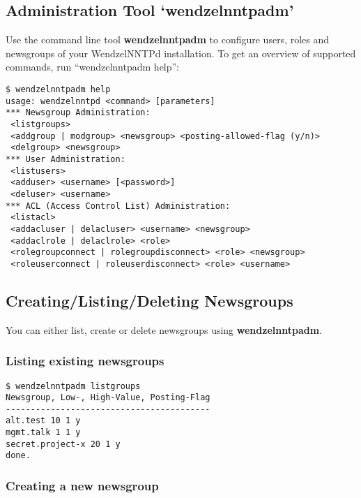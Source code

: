 \documentclass[12pt,fleqn,leqno]{scrbook}
\begin{document}
\hypertarget{administration-tool-wendzelnntpadm}{%
\subsection{Administration Tool
`wendzelnntpadm'}\label{administration-tool-wendzelnntpadm}}

Use the command line tool \textbf{wendzelnntpadm} to configure users,
roles and newsgroups of your WendzelNNTPd installation. To get an
overview of supported commands, run ``wendzelnntpadm help'':

\begin{verbatim}
$ wendzelnntpadm help
usage: wendzelnntpd <command> [parameters]
*** Newsgroup Administration:
 <listgroups>
 <addgroup | modgroup> <newsgroup> <posting-allowed-flag (y/n)>
 <delgroup> <newsgroup>
*** User Administration:
 <listusers>
 <adduser> <username> [<password>]
 <deluser> <username>
*** ACL (Access Control List) Administration:
 <listacl>
 <addacluser | delacluser> <username> <newsgroup>
 <addaclrole | delaclrole> <role>
 <rolegroupconnect | rolegroupdisconnect> <role> <newsgroup>
 <roleuserconnect | roleuserdisconnect> <role> <username>
\end{verbatim}

\hypertarget{creatinglistingdeleting-newsgroups}{%
\subsection{Creating/Listing/Deleting
Newsgroups}\label{creatinglistingdeleting-newsgroups}}

You can either list, create or delete newsgroups using
\textbf{wendzelnntpadm}.

\hypertarget{listing-existing-newsgroups}{%
\subsubsection{Listing existing
newsgroups}\label{listing-existing-newsgroups}}

\begin{verbatim}
$ wendzelnntpadm listgroups
Newsgroup, Low-, High-Value, Posting-Flag
-----------------------------------------
alt.test 10 1 y
mgmt.talk 1 1 y
secret.project-x 20 1 y
done.
\end{verbatim}

\hypertarget{creating-a-new-newsgroup}{%
\subsubsection{Creating a new
newsgroup}\label{creating-a-new-newsgroup}}
\end{document}
